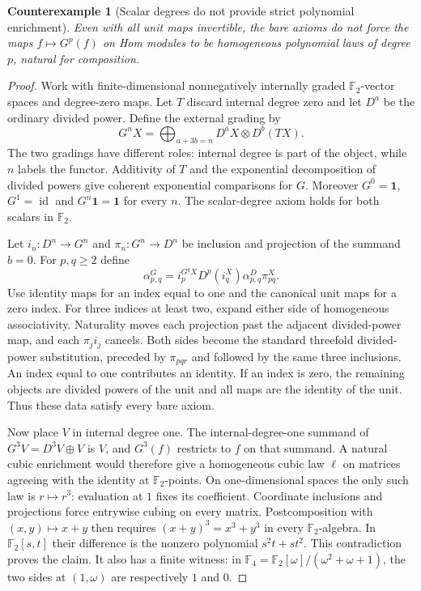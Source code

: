 \documentclass[11pt,a4paper]{article}
\newtheorem{counterexample}[theorem]{Counterexample}
\theoremstyle{definition}
\newcommand{\id}{\operatorname{id}}
\newcommand{\F}{\mathbb F}
\begin{document}
\begin{counterexample}[Scalar degrees do not provide strict polynomial enrichment]\label{ex:enrichment}
Even with all unit maps invertible, the bare axioms do not force the maps
$f\mapsto G^p(f)$ on Hom modules to be homogeneous polynomial laws of
degree $p$, natural for composition.
\end{counterexample}
\begin{proof}
Work with finite-dimensional nonnegatively internally graded
$\F_2$-vector spaces and degree-zero maps. Let $T$ discard internal
degree zero and let $D^a$ be the ordinary divided power. Define the
external grading by
\[
 G^nX=\bigoplus_{a+3b=n}D^aX\otimes D^b(TX).
\]
The two gradings have different roles: internal degree is part of the
object, while $n$ labels the functor. Additivity of $T$ and the
exponential decomposition of divided powers give coherent exponential
comparisons for $G$. Moreover $G^0=\mathbf1$, $G^1=\id$ and
$G^n\mathbf1=\mathbf1$ for every $n$. The scalar-degree axiom holds
for both scalars in $\F_2$.

Let $i_n:D^n\to G^n$ and $\pi_n:G^n\to D^n$ be inclusion and
projection of the summand $b=0$. For $p,q\ge2$ define
\[
 \alpha^G_{p,q}
 =i_p^{G^qX}D^p(i_q^X)\alpha^D_{p,q}\pi_{pq}^X.
\]
Use identity maps for an index equal to one and the canonical unit
maps for a zero index. For three indices at least two, expand either
side of homogeneous associativity. Naturality moves each projection
past the adjacent divided-power map, and each $\pi_j i_j$ cancels.
Both sides become the standard threefold divided-power substitution,
preceded by $\pi_{pqr}$ and followed by the same three inclusions.
An index equal to one contributes an identity. If an index is zero,
the remaining objects are divided powers of the unit and all maps
are the identity of the unit. Thus these data satisfy every bare axiom.

Now place $V$ in internal degree one. The internal-degree-one summand
of $G^3V=D^3V\oplus V$ is $V$, and $G^3(f)$ restricts to $f$ on
that summand. A natural cubic enrichment would therefore give a
homogeneous cubic law $\ell$ on matrices agreeing with the identity
at $\F_2$-points. On one-dimensional spaces the only such law is
$r\mapsto r^3$: evaluation at $1$ fixes its coefficient. Coordinate
inclusions and projections force entrywise cubing on every matrix.
Postcomposition with $(x,y)\mapsto x+y$ then requires
$(x+y)^3=x^3+y^3$ in every $\F_2$-algebra. In $\F_2[s,t]$ their
difference is the nonzero polynomial $s^2t+st^2$. This contradiction
proves the claim. It also has a finite witness: in
$\F_4=\F_2[\omega]/(\omega^2+\omega+1)$, the two sides at
$(1,\omega)$ are respectively $1$ and $0$.
\end{proof}
\end{document}
